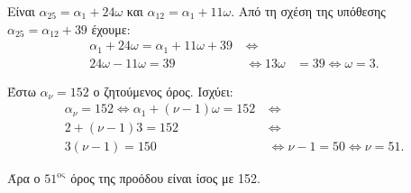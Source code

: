 
\begin{alist}
\item Είναι $\alpha_{25} = \alpha_1 + 24\omega$ και $\alpha_{12} = \alpha_1 + 11\omega$.
Από τη σχέση της υπόθεσης $\alpha_{25} = \alpha_{12} + 39$ έχουμε:
\begin{align*}
\alpha_1 + 24\omega = \alpha_1 + 11\omega + 39 \ &\Leftrightarrow \\
24\omega - 11\omega = 39 \ &\Leftrightarrow 13\omega &= 39 \Leftrightarrow \omega = 3.
\end{align*}

\item Έστω $\alpha_\nu = 152$ ο ζητούμενος όρος. Ισχύει:
\begin{align*}
\alpha_\nu = 152 \Leftrightarrow \alpha_1 + (\nu - 1)\omega = 152 \ &\Leftrightarrow \\
2 + (\nu - 1)3 = 152 \ &\Leftrightarrow \\
3(\nu - 1) = 150 \ &\Leftrightarrow \nu - 1 = 50 \Leftrightarrow \nu = 51.
\end{align*}

Άρα ο $51^{\text{ος}}$ όρος της προόδου είναι ίσος με 152.
\end{alist}


